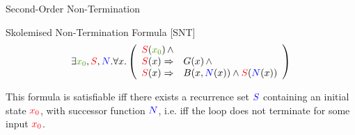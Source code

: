 \documentclass[xcolor=pdftex,t,11pt]{beamer}
\newcommand{\red}[1]{\textcolor{red}{#1}}
\newcommand{\blue}[1]{\textcolor{blue}{#1}}
\newcommand{\green}[1]{\textcolor{ta3chameleon}{#1}}
\begin{document}
\begin{frame}{Second-Order Non-Termination}

\begin{block}{Skolemised Non-Termination Formula [SNT]}
 \[
 \exists \green{x_0}, \red{S}, \blue{N} . \forall x . \left ( \begin{array}{rl}
   \red{S}(\green{x_0}) \, \wedge & \\
   \red{S}(x) \Rightarrow & G(x) \, \wedge \\
   \red{S}(x) \Rightarrow & B(x, \blue{N}(x)) \wedge \red{S}(\blue{N}(x))
   \end{array} \right )
 \]
 \end{block}

 \vspace{1em}

This formula is satisfiable iff there exists a recurrence set $\blue{S}$ containing
an initial state $\red{x_0}$, with successor function $\blue{N}$, i.e. iff the loop
does not terminate for some input $\red{x_0}$.
\end{frame}

% 
% 
% 
% 
% 
% 
% 
% 
% 
% 
\end{document}
